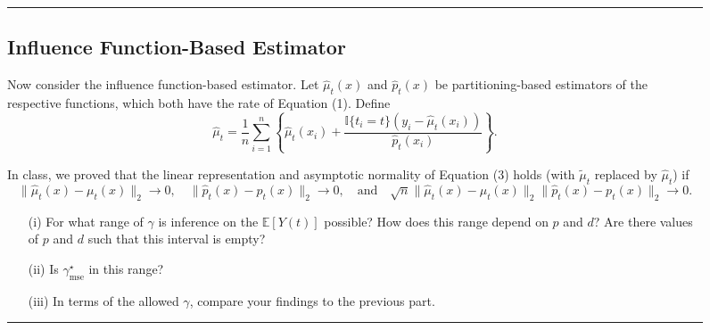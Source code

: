 \documentclass{article}
\newenvironment{colorparagraph}[1]{\par\color{#1}}{\par}
\begin{document}
\begin{figure}[H]
  \begin{colorparagraph}{questioncolor}
  \rule{\textwidth}{0.5pt}
  \label{q1h}
  \subsection{Influence Function-Based Estimator}

  Now consider the influence function-based estimator. Let \( \hat{\mu}_t(x) \) and \( \hat{p}_t(x) \) be partitioning-based estimators of the respective functions, which both have the rate of Equation (1). Define
  \[
  \hat{\mu}_t = \frac{1}{n} \sum_{i=1}^n \left\{ \hat{\mu}_t(x_i) + \frac{\mathbb{I}\{t_i = t\}(y_i - \hat{\mu}_t(x_i))}{\hat{p}_t(x_i)} \right\}.
  \]

  In class, we proved that the linear representation and asymptotic normality of Equation (3) holds (with \( \tilde{\mu}_t \) replaced by \( \hat{\mu}_t \)) if
  \[
  \|\hat{\mu}_t(x) - \mu_t(x)\|_2 \to 0, \quad \|\hat{p}_t(x) - p_t(x)\|_2 \to 0, \quad \text{and} \quad \sqrt{n} \|\hat{\mu}_t(x) - \mu_t(x)\|_2 \|\hat{p}_t(x) - p_t(x)\|_2 \to 0.
  \]

  \begin{itemize}
      \item[(i)] For what range of \( \gamma \) is inference on the \( \mathbb{E}[Y(t)] \) possible? How does this range depend on \( p \) and \( d \)? Are there values of \( p \) and \( d \) such that this interval is empty?
      \item[(ii)] Is \( \gamma^\star_{\text{mse}} \) in this range?
      \item[(iii)] In terms of the allowed \( \gamma \), compare your findings to the previous part.
  \end{itemize}

  \rule{\textwidth}{0.5pt}
  \end{colorparagraph}
\end{figure}
\end{document}
